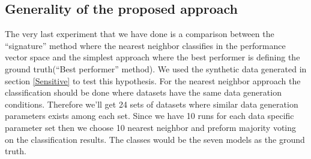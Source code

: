 \subsection{Generality of the proposed approach}
\label{Classification}

The very last experiment that we have done is a comparison between the ``signature'' method where the nearest neighbor classifies in the performance vector space and the simplest approach where the best performer is defining the ground truth(``Best performer'' method). We used the synthetic data generated in section \ref{Sensitive} to test this hypothesis. For the nearest neighbor approach the classification should be done where datasets have the same data generation conditions. Therefore we'll get 24 sets of datasets where similar data generation parameters exists among each set. Since we have 10 runs for each data specific parameter set then we choose 10 nearest neighbor and preform majority voting on the classification results. The classes would be the seven models as the ground truth.
